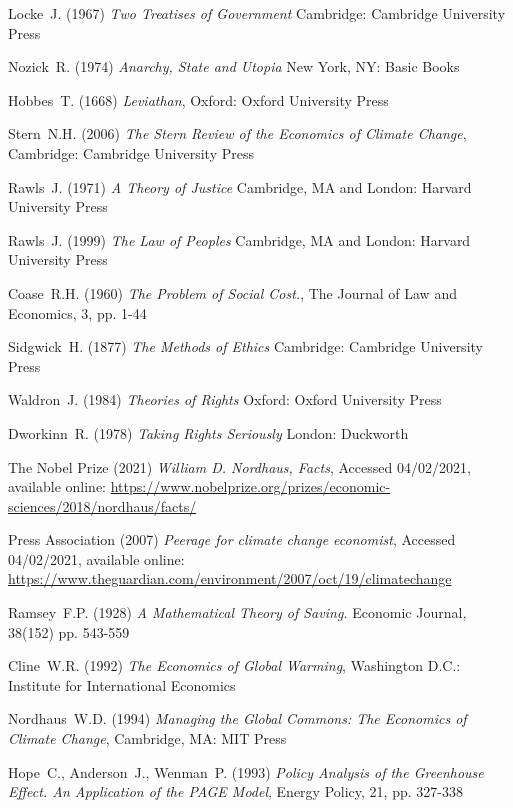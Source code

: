 \documentclass[11pt, oneside]{article}   	%
\begin{document}
\begin{thebibliography}{99}

 Locke~J. (1967)
\emph{Two Treatises of Government}
Cambridge: Cambridge University Press
	
 Nozick~R. (1974)
\emph{Anarchy, State and Utopia}
New York, NY: Basic Books
	
 Hobbes~T. (1668)
\emph{Leviathan},
Oxford: Oxford University Press
	
 Stern~N.H. (2006)
\emph{The Stern Review of the Economics of Climate Change},
Cambridge: Cambridge University Press
		
 Rawls~J. (1971)
\emph{A Theory of Justice}
Cambridge, MA and London: Harvard University Press
		
 Rawls~J. (1999)
\emph{The Law of Peoples}
Cambridge, MA and London: Harvard University Press
		
 Coase~R.H. (1960)
\emph{The Problem of Social Cost.},
The Journal of Law and Economics, 3, pp. 1-44
		
 Sidgwick~H. (1877)
\emph{The Methods of Ethics}
Cambridge: Cambridge University Press
		
 Waldron~J. (1984)
\emph{Theories of Rights}
Oxford: Oxford University Press
		
 Dworkinn~R. (1978)
\emph{Taking Rights Seriously}
London: Duckworth
		
 The Nobel Prize (2021)
\emph{William D. Nordhaus, Facts},
Accessed 04/02/2021, available online: 
\url{https://www.nobelprize.org/prizes/economic-sciences/2018/nordhaus/facts/}
		
 Press Association (2007)
\emph{Peerage for climate change economist},
Accessed 04/02/2021, available online: 
\url{https://www.theguardian.com/environment/2007/oct/19/climatechange}
		
 Ramsey~F.P. (1928)
\emph{A Mathematical Theory of Saving.}
Economic Journal, 38(152) pp. 543-559
		
 Cline~W.R. (1992)
\emph{The Economics of Global Warming},
Washington D.C.: Institute for International Economics
		
 Nordhaus~W.D. (1994)
\emph{Managing the Global Commons: The Economics of Climate Change},
Cambridge, MA: MIT Press
		
 Hope~C., Anderson~J., Wenman~P. (1993)
\emph{Policy Analysis of the Greenhouse Effect. An Application of the PAGE Model},
Energy Policy, 21, pp. 327-338
		

\end{thebibliography}
\end{document}

